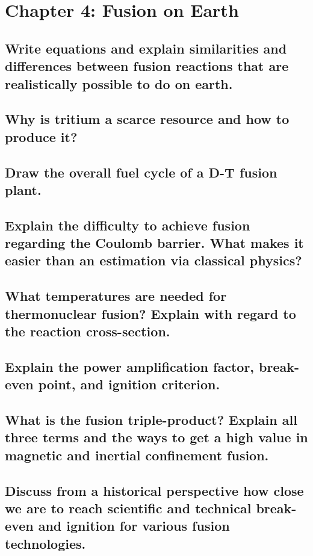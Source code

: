 \section{Chapter 4: Fusion on Earth}

\subsection{Write equations and explain similarities and differences between fusion reactions that are realistically possible to do on earth.}
\solutionblock{}

\subsection{Why is tritium a scarce resource and how to produce it?}
\solutionblock{}

\subsection{Draw the overall fuel cycle of a D-T fusion plant.}
\solutionblock{}

\subsection{Explain the difficulty to achieve fusion regarding the Coulomb barrier. What makes it easier than an estimation via classical physics?}
\solutionblock{}

\subsection{What temperatures are needed for thermonuclear fusion? Explain with regard to the reaction cross-section.}
\solutionblock{}

\subsection{Explain the power amplification factor, break-even point, and ignition criterion.}
\solutionblock{}

\subsection{What is the fusion triple-product? Explain all three terms and the ways to get a high value in magnetic and inertial confinement fusion.}
\solutionblock{}

\subsection{Discuss from a historical perspective how close we are to reach scientific and technical break-even and ignition for various fusion technologies.}
\solutionblock{}
